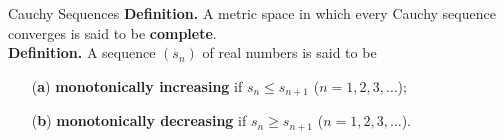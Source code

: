 \documentclass{beamer}
\begin{document}
\begin{frame}{Cauchy Sequences}
\textbf{Definition.} A metric space in which every Cauchy sequence converges is said to be \textbf{complete}.\\

\textbf{Definition.} A sequence $(s_n)$ of real numbers is said to be
\begin{enumerate}
    \item[(\textbf{a})] \textbf{monotonically increasing} if $s_n \leq s_{n+1}$ ($n = 1, 2, 3, \dotsc$);
    \item[(\textbf{b})] \textbf{monotonically decreasing} if $s_n \geq s_{n+1}$ ($n = 1, 2, 3, \dotsc$).
\end{enumerate}
\end{frame}
\end{document}
